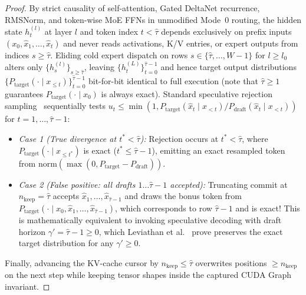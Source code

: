 \documentclass[10pt,twocolumn]{article}
\theoremstyle{definition}
\begin{document}
\begin{proof}
By strict causality of self-attention, Gated DeltaNet recurrence, RMSNorm, and token-wise MoE FFNs in unmodified Mode~0 routing, the hidden state $h_t^{(l)}$ at layer $l$ and token index $t < \hat{\tau}$ depends exclusively on prefix inputs $(x_0, \hat{x}_1, \dots, \hat{x}_t)$ and never reads activations, K/V entries, or expert outputs from indices $s \ge \hat{\tau}$. Eliding cold expert dispatch on rows $s \in \{\hat{\tau}, \dots, W-1\}$ for $l \ge l_0$ alters only $\{h_s^{(l)}\}_{s \ge \hat{\tau}}$, leaving $\{h_t^{(L)}\}_{t=0}^{\hat{\tau}-1}$ and hence target output distributions $\{P_{\text{target}}(\cdot \mid x_{\le t})\}_{t=0}^{\hat{\tau}-1}$ bit-for-bit identical to full execution (note that $\hat{\tau} \ge 1$ guarantees $P_{\text{target}}(\cdot \mid x_0)$ is always exact). Standard speculative rejection sampling~\cite{leviathan2023speculative} sequentially tests $u_t \le \min(1, P_{\text{target}}(\hat{x}_t \mid x_{<t}) / P_{\text{draft}}(\hat{x}_t \mid x_{<t}))$ for $t = 1, \dots, \hat{\tau}-1$:
\begin{itemize}
  \item \emph{Case 1 (True divergence at $t^* < \hat{\tau}$):} Rejection occurs at $t^* < \hat{\tau}$, where $P_{\text{target}}(\cdot \mid x_{\le t^*})$ is exact ($t^* \le \hat{\tau}-1$), emitting an exact resampled token from $\mathrm{norm}(\max(0, P_{\text{target}} - P_{\text{draft}}))$.
  \item \emph{Case 2 (False positive: all drafts $1 \dots \hat{\tau}-1$ accepted):} Truncating commit at $n_{\mathrm{keep}} = \hat{\tau}$ accepts $\hat{x}_1, \dots, \hat{x}_{\hat{\tau}-1}$ and draws the bonus token from $P_{\text{target}}(\cdot \mid x_0, \hat{x}_1, \dots, \hat{x}_{\hat{\tau}-1})$, which corresponds to row $\hat{\tau}-1$ and is exact! This is mathematically equivalent to invoking speculative decoding with draft horizon $\gamma' = \hat{\tau}-1 \ge 0$, which Leviathan et al.~\cite{leviathan2023speculative} prove preserves the exact target distribution for any $\gamma' \ge 0$.
\end{itemize}
Finally, advancing the KV-cache cursor by $n_{\mathrm{keep}} \le \hat{\tau}$ overwrites positions $\ge n_{\mathrm{keep}}$ on the next step while keeping tensor shapes inside the captured CUDA Graph invariant.
\end{proof}
\end{document}
